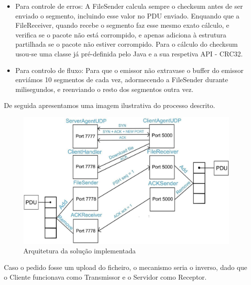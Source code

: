 \documentclass{article}
\begin{document}
\begin{itemize}
\item Para controle de erros: A FileSender calcula sempre o checksum antes de ser enviado o segmento, incluindo esse valor no PDU enviado.
Enquando que a FileReceiver, quando recebe o segmento faz esse mesmo exato cálculo, e verifica se o pacote não está corrompido, e apenas
adiciona à estrutura partilhada se o pacote não estiver corrompido. Para o cálculo do checksum usou-se uma classe já pré-definida pelo Java e a sua respetiva API - CRC32.
\item Para controlo de fluxo: Para que o emissor não extravase o buffer do emissor enviámos 10 segmentos de cada vez, adormecendo a FileSender
durante milisegundos, e reenviando o resto dos segmentos outra vez.
\end{itemize}
De seguida apresentamos uma imagem ilustrativa do processo descrito.
\begin{figure}[H]
\centering
\includegraphics[scale=0.25]{img/imagem.jpg}
\caption{Arquitetura da solução implementada}
\end{figure}
Caso o pedido fosse um upload do ficheiro, o mecanismo seria o inverso, dado que o Cliente funcionava como Transmissor e o Servidor como Receptor.
\end{document}
